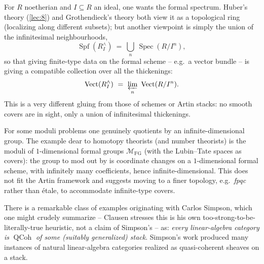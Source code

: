 \begin{example}
\label{ex:15:formal-schemes}
For $R$ noetherian and $I\subseteq R$ an ideal, one wants the formal spectrum. Huber's
theory (\cref{lec:8}) and Grothendieck's theory both view it as a topological ring
(localizing along different subsets); but another viewpoint is simply the union of
the infinitesimal neighbourhoods,
\begin{equation}
\label{eq:15:spf}
\operatorname{Spf}(R^{\wedge}_I)\ =\ \bigcup_{n}\ \operatorname{Spec}(R/I^{n}),
\end{equation}
so that giving finite-type data on the formal scheme -- e.g.\ a vector bundle --
is giving a compatible collection over all the thickenings:
\begin{equation}
\label{eq:15:vect-formal}
\operatorname{Vect}(R^{\wedge}_I)\ =\ \varprojlim_{n}\ \operatorname{Vect}(R/I^{n}).
\end{equation}
This is a very different gluing from those of schemes or Artin stacks: no smooth
covers are in sight, only a union of infinitesimal thickenings.
\end{example}

\begin{example}
\label{ex:15:formal-groups}
For some moduli problems one genuinely quotients by an infinite-dimensional group.
The example dear to homotopy theorists (and number theorists) is the moduli of
$1$-dimensional formal groups $\mathcal{M}_{\mathrm{FG}}$ (with the Lubin--Tate
spaces as covers): the group to mod out by is coordinate changes on a
$1$-dimensional formal scheme, with infinitely many coefficients, hence
infinite-dimensional. This does not fit the Artin framework and suggests moving to a
finer topology, e.g.\ \emph{fpqc} rather than \'etale, to accommodate infinite-type
covers.
\end{example}

\begin{remark}
\label{rmk:15:simpson}
There is a remarkable class of examples originating with Carlos Simpson, which one
might crudely summarize -- Clausen stresses this is his own too-strong-to-be-literally-true
heuristic, not a claim of Simpson's -- as: \emph{every linear-algebra category is}
$\operatorname{QCoh}$ \emph{of some (suitably generalized) stack}. Simpson's work
produced many instances of natural linear-algebra categories realized as
quasi-coherent sheaves on a stack.
\end{remark}

